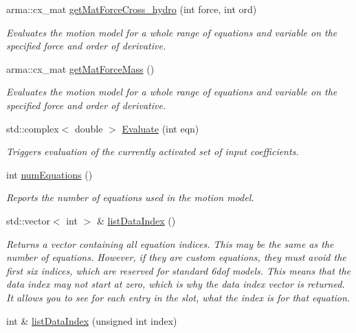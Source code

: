\begin{DoxyCompactItemize}
arma\-::cx\-\_\-mat \hyperlink{classosea_1_1ofreq_1_1_motion_model_a7d661c296c3fe5c97322a62cceabb5d4}{get\-Mat\-Force\-Cross\-\_\-hydro} (int force, int ord)
\begin{DoxyCompactList}\small\item\em Evaluates the motion model for a whole range of equations and variable on the specified force and order of derivative. \end{DoxyCompactList}\item 
arma\-::cx\-\_\-mat \hyperlink{classosea_1_1ofreq_1_1_motion_model_a7215db9f6f0c3e79f4559a4b9eadbcfc}{get\-Mat\-Force\-Mass} ()
\begin{DoxyCompactList}\small\item\em Evaluates the motion model for a whole range of equations and variable on the specified force and order of derivative. \end{DoxyCompactList}\item 
std\-::complex$<$ double $>$ \hyperlink{classosea_1_1ofreq_1_1_motion_model_a331d96a45df8ca0911fc4610705c3a30}{Evaluate} (int eqn)
\begin{DoxyCompactList}\small\item\em Triggers evaluation of the currently activated set of input coefficients. \end{DoxyCompactList}\item 
int \hyperlink{classosea_1_1ofreq_1_1_motion_model_a0a228c24a524e2a1c6636d3121a842be}{num\-Equations} ()
\begin{DoxyCompactList}\small\item\em Reports the number of equations used in the motion model. \end{DoxyCompactList}\item 
std\-::vector$<$ int $>$ \& \hyperlink{classosea_1_1ofreq_1_1_motion_model_af9e72eac109b2d1bff50bb8759f113c3}{list\-Data\-Index} ()
\begin{DoxyCompactList}\small\item\em Returns a vector containing all equation indices. This may be the same as the number of equations. However, if they are custom equations, they must avoid the first six indices, which are reserved for standard 6dof models. This means that the data index may not start at zero, which is why the data index vector is returned. It allows you to see for each entry in the slot, what the index is for that equation. \end{DoxyCompactList}\item 
int \& \hyperlink{classosea_1_1ofreq_1_1_motion_model_ab9c11dbb141ed78daa137d562b4409a7}{list\-Data\-Index} (unsigned int index)

\end{DoxyCompactItemize}
